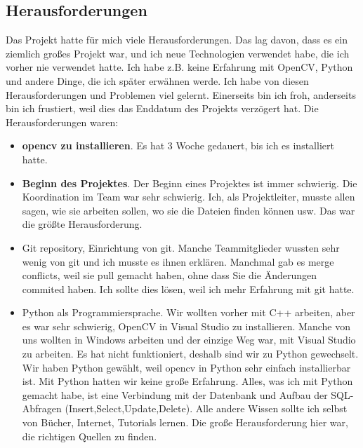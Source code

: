 \subsection{Herausforderungen}
Das Projekt hatte f\"ur mich viele Herausforderungen. Das lag davon, dass es ein ziemlich gro{\ss}es Projekt war, und ich neue Technologien verwendet habe, die ich vorher nie verwendet hatte. Ich habe z.B. keine Erfahrung mit OpenCV, Python und andere Dinge, die ich sp\"ater erw\"ahnen werde. Ich habe von diesen Herausforderungen und Problemen viel gelernt. Einerseits bin ich froh, anderseits bin ich frustiert, weil dies das Enddatum des Projekts verz\"ogert hat. 
Die Herausforderungen waren:

\begin{itemize}
	\item \textbf{opencv zu installieren}. Es hat 3 Woche gedauert, bis ich es installiert hatte. 
	
	\item \textbf{Beginn des Projektes}. Der Beginn eines Projektes ist immer schwierig. Die Koordination im Team war sehr schwierig. Ich, als Projektleiter, musste allen sagen, wie sie arbeiten sollen, wo sie die Dateien finden k\"onnen usw. Das war die gr\"o{\ss}te Herausforderung.
		
	\item Git repository, Einrichtung von git. Manche Teammitglieder wussten sehr wenig von git und ich musste es ihnen erkl\"aren. Manchmal gab es merge conflicts, weil sie pull gemacht haben, ohne dass Sie die \"Anderungen commited haben. Ich sollte dies l\"osen, weil ich mehr Erfahrung mit git hatte. 
	
	\item Python als Programmiersprache. Wir wollten vorher mit C++ arbeiten, aber es war sehr schwierig, OpenCV in Visual Studio zu installieren. Manche von uns wollten in Windows arbeiten und der einzige Weg war, mit Visual Studio zu arbeiten. Es hat nicht funktioniert, deshalb sind wir zu Python gewechselt. Wir haben Python gew\"ahlt, weil opencv in Python sehr einfach installierbar ist. Mit Python hatten wir keine gro{\ss}e Erfahrung. Alles, was ich mit Python gemacht habe, ist eine Verbindung mit der Datenbank und Aufbau der SQL-Abfragen (Insert,Select,Update,Delete). Alle andere Wissen sollte ich selbst von B\"ucher, Internet, Tutorials lernen. Die gro{\ss}e Herausforderung hier war, die richtigen Quellen zu finden.
	

\end{itemize}
